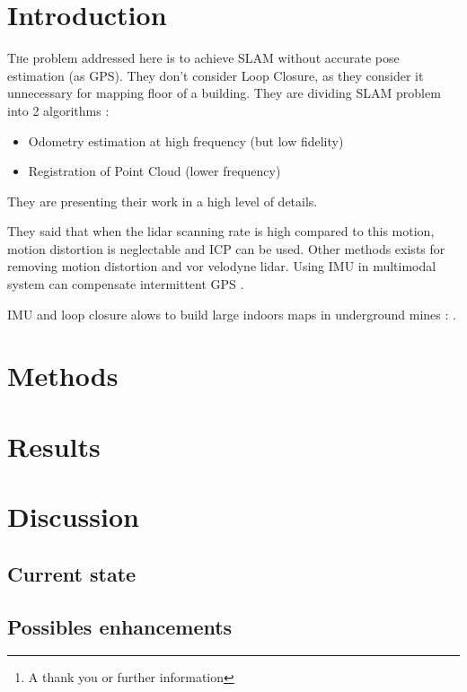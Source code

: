 \documentclass[twoside,twocolumn]{article}
\title{\citetitle{zhang_low-drift_2017}} %
\author{%
\textsc{Virgile Daugé}\thanks{A thank you or further information} \\[1ex] %
\normalsize University of Lorraine \\ %
\normalsize \href{mailto:virgile.dauge@inria.fr}{virgile.dauge@inria.fr} %
}
\date{\today} %
\begin{document}
\maketitle


\section{Introduction}
\lettrine[nindent=0em,lines=3]{T}he problem addressed here is to achieve SLAM without accurate pose estimation (as GPS).
They don't consider Loop Closure, as they consider it unnecessary for mapping floor of a building.
They are dividing SLAM problem into 2 algorithms :
\begin{itemize}
  \item Odometry estimation at high frequency (but low fidelity)
  \item Registration of Point Cloud (lower frequency)
\end{itemize}

They are presenting their work in a high level of details.

They said that when the lidar scanning rate is high compared to this motion, motion distortion is neglectable and ICP \cite{pomerleau_comparing_2013} can be used.
Other methods exists for removing motion distortion \cite{hong_vicp:_2010} and \cite{moosmann_velodyne_2011} vor velodyne lidar.
Using IMU in multimodal system can compensate intermittent GPS \cite{scherer_river_2012}.

IMU and loop closure alows to build large indoors maps in underground mines : \cite{yoshida_efficient_2014}.


\blindtext


\section{Methods}
\blindtext



\section{Results}
\blindtext


\section{Discussion}
\subsection{Current state}
\blindtext
\subsection{Possibles enhancements}
\blindtext

\printbibliography
\end{document}
